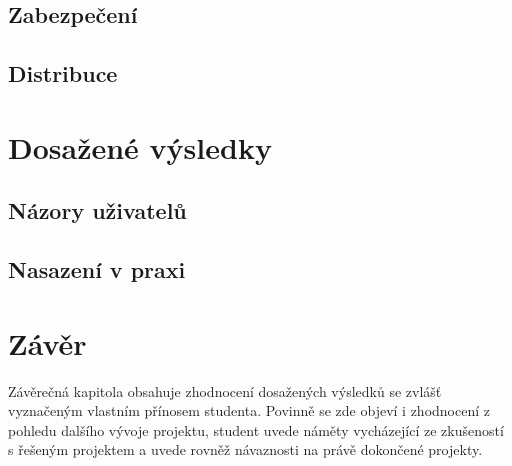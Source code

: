 \section{Zabezpečení}
\section{Distribuce}

\chapter{Dosažené výsledky}
\section{Názory uživatelů}
\section{Nasazení v praxi}

\chapter{Závěr}
Závěrečná kapitola obsahuje zhodnocení dosažených výsledků se zvlášť vyznačeným vlastním přínosem studenta. Povinně se zde objeví i zhodnocení z pohledu dalšího vývoje projektu, student uvede náměty vycházející ze zkušeností s řešeným projektem a uvede rovněž návaznosti na právě dokončené projekty.

